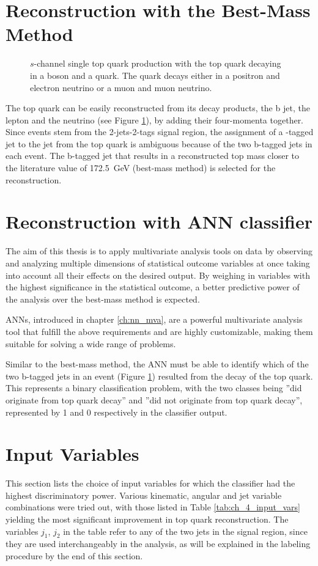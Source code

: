 \section{Reconstruction with the Best-Mass Method}
\label{sec:ch-4-best-mass}
\begin{figure}[h]
    \centering
    
    \caption{$s$-channel single top quark production with the top quark decaying in a \PWplus boson and a \Pbottom quark. The \PWplus quark decays either in a positron and electron neutrino or a muon and muon neutrino.}
    \label{fig:ch_4_single_top_reco}
\end{figure}
The top quark can be easily reconstructed from its decay products, the b jet, the lepton and the neutrino (see Figure \ref{fig:ch_4_single_top_reco}), by adding their four-momenta together. Since events stem from the 2-jets-2-tags signal region, the assignment of a \Pbottom-tagged jet to the \Pbottom jet from the top quark is ambiguous because of the two b-tagged jets in each event. The b-tagged jet that results in a reconstructed top mass closer to the literature value of \SI{172.5}{GeV} (best-mass method) is selected for the reconstruction.

\section{Reconstruction with ANN classifier}
The aim of this thesis is to apply multivariate analysis tools on data by observing and analyzing multiple dimensions of statistical outcome variables at once taking into account all their effects on the desired output. By weighing in variables with the highest significance in the statistical outcome, a better predictive power of the analysis over the best-mass method is expected.

ANNs, introduced in chapter \ref{ch:nn_mva}, are a powerful multivariate analysis tool that fulfill the above requirements and are highly customizable, making them suitable for solving a wide range of problems.

Similar to the best-mass method, the ANN must be able to identify which of the two b-tagged jets in an event (Figure \ref{fig:ch_4_single_top_reco}) resulted from the decay of the top quark. This represents a binary classification problem, with the two classes being ''did originate from top quark decay'' and ''did not originate from top quark decay'', represented by 1 and 0 respectively in the classifier output.

\section{Input Variables}
\label{sec:ch-4-input-vars}
This section lists the choice of input variables for which the classifier had the highest discriminatory power. Various kinematic, angular and jet variable combinations were tried out, with those listed in Table \ref{tab:ch_4_input_vars} yielding the most significant improvement in top quark reconstruction. The variables $j_1$, $j_2$ in the table refer to any of the two jets in the signal region, since they are used interchangeably in the analysis, as will be explained in the labeling procedure by the end of this section.

